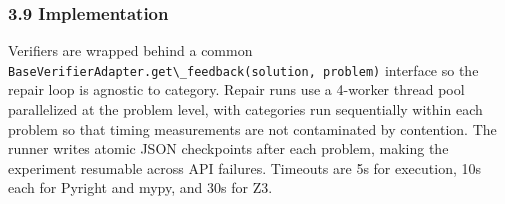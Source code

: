 \subsubsection{3.9 Implementation}

Verifiers are wrapped behind a common \texttt{BaseVerifierAdapter.get\textbackslash \_feedback(solution, problem)} interface so the repair loop is agnostic to category. Repair runs use a 4-worker thread pool parallelized at the problem level, with categories run sequentially within each problem so that timing measurements are not contaminated by contention. The runner writes atomic JSON checkpoints after each problem, making the experiment resumable across API failures. Timeouts are 5s for execution, 10s each for Pyright and mypy, and 30s for Z3.

